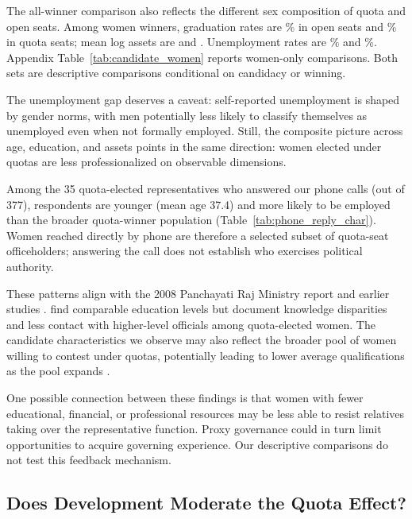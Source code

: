 \documentclass[12pt]{article}
\begin{document}


The all-winner comparison also reflects the different sex composition of quota and open seats. Among women winners, graduation rates are \womenGraduateOpen{}\% in open seats and \womenGraduateQuota{}\% in quota seats; mean log assets are \womenLogassetsOpen{} and \womenLogassetsQuota{}. Unemployment rates are \womenUnemployedOpen{}\% and \womenUnemployedQuota{}\%. Appendix Table~\ref{tab:candidate_women} reports women-only comparisons. Both sets are descriptive comparisons conditional on candidacy or winning.

The unemployment gap deserves a caveat: self-reported unemployment is shaped by gender norms, with men potentially less likely to classify themselves as unemployed even when not formally employed. Still, the composite picture across age, education, and assets points in the same direction: women elected under quotas are less professionalized on observable dimensions.

Among the 35 quota-elected representatives who answered our phone calls (out of 377), respondents are younger (mean age 37.4) and more likely to be employed than the broader quota-winner population (Table~\ref{tab:phone_reply_char}). Women reached directly by phone are therefore a selected subset of quota-seat officeholders; answering the call does not establish who exercises political authority.

These patterns align with the 2008 Panchayati Raj Ministry report \citep[pp.~26, 63]{ministry2008} and earlier studies \citep[Table~VII]{chattopadhyay2004women, ban2008tokenism, raabe2009effects}. \citet[Tables~5--6]{gajwani2015gender} find comparable education levels but document knowledge disparities and less contact with higher-level officials among quota-elected women. The candidate characteristics we observe may also reflect the broader pool of women willing to contest under quotas, potentially leading to lower average qualifications as the pool expands \citep{bhavnani2024does}.

One possible connection between these findings is that women with fewer educational, financial, or professional resources may be less able to resist relatives taking over the representative function. Proxy governance could in turn limit opportunities to acquire governing experience. Our descriptive comparisons do not test this feedback mechanism.

\subsection{Does Development Moderate the Quota Effect?}\label{sec:het_effects}
\end{document}
